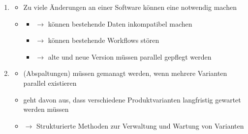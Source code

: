 \begin{infoBox}[title=Software-Variabilität \& Versionsmanagement]
    \begin{enumerate}
        \item {}
        \begin{itemize}
            \item Zu viele Änderungen an einer Software können eine  notwendig machen
            \item {}
            \begin{itemize}
                \item {} $\rightarrow$ können bestehende Daten inkompatibel machen
                \item {} $\rightarrow$ können bestehende Workflows stören
                \item {} $\rightarrow$ alte und neue Version müssen parallel gepflegt werden
            \end{itemize}
        \end{itemize}
        \item {}
        \begin{itemize}
            \item {} (Abspaltungen) müssen gemanagt werden, wenn mehrere Varianten parallel existieren
            \item {} geht davon aus, dass verschiedene Produktvarianten langfristig gewartet werden müssen
            \item {} $\rightarrow$ Strukturierte Methoden zur Verwaltung und Wartung von Varianten
        \end{itemize}
    \end{enumerate}
\end{infoBox}

